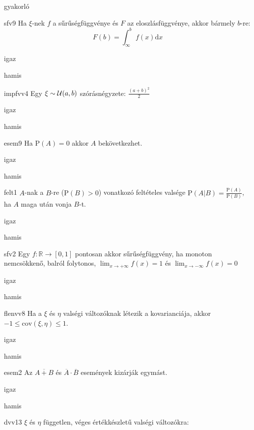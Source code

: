 \documentclass[12pt]{article}
\begin{document}
\begin{quiz}{gyakorló}
\begin{multi}[feedback={Def.}]{sfv9}
Ha $\xi$-nek $f$ a sűrűségfüggvénye és $F$ az eloszlásfüggvénye, akkor bármely $b$-re:
$$
F(b)=\int_{\infty}^{b}f(x)\mathrm{d } x
$$
\item* igaz
\item hamis
\end{multi}
\begin{multi}[feedback={wiki}]{impfvv4}
Egy $\xi\sim {\cal U}(a,b)$ szórásnégyzete: $\frac{(a+b)^2}{2}$
\item igaz
\item* hamis
\end{multi}
\begin{multi}[feedback={Például: legyen a kísérlet random húzás a $[0,1]$-ből és $A=\{\frac{1}{2}\}$}]{esem9}
Ha $\mathrm{P}(A)=0$ akkor $A$ bekövetkezhet.
\item* igaz
\item hamis
\end{multi}
\begin{multi}[feedback={Def.+$P(AB)=P(A)$ a feltételekből.}]{felt1}
$A$-nak a $B$-re ($\mathrm{P}(B)>0$) vonatkozó feltételes valsége $\mathrm{P}(A|B)=\frac{\mathrm{P}(A)}{\mathrm{P}(B)}$, ha $A$ maga után vonja $B$-t.
\item* igaz
\item hamis
\end{multi}
\begin{multi}[feedback={Def.}]{sfv2}
Egy $f:\mathbb{R}\to [0,1]$ pontosan akkor sűrűségfüggvény, ha monoton nemcsökkenő, 
balról folytonos, $\lim_{x\to+\infty}f(x)=1$ és $\lim_{x\to-\infty}f(x)=0$
\item igaz
\item* hamis
\end{multi}
\begin{multi}[feedback={Ilyesmi a $\mathrm{corr}$-ra igaz.}]{flenvv8}
Ha a $\xi$ és $\eta$ valségi változóknak létezik a kovarianciája, akkor $-1\le \mathrm{cov}(\xi,\eta)\le 1$.
\item igaz
\item* hamis
\end{multi}
\begin{multi}[feedback={de-Morgan azonosság}]{esem2}
Az $\overline{A+B}$ és $\overline{A} \cdot \overline{B}$ események kizárják egymást.
\item igaz
\item* hamis
\end{multi}
\begin{multi}[feedback={Páronként független valségi változókra a szórásnégyzet additív.}]{dvv13}
$\xi$ és $\eta$ független, véges értékkészletű valségi változókra:

\end{multi}
\end{quiz}
\end{document}
